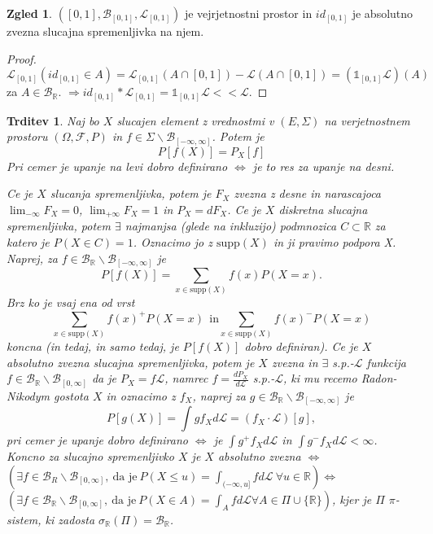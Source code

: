 \documentclass[a4paper,12pt]{article}
\theoremstyle{definition} %
\newtheorem{zgled}[definicija]{Zgled}
\theoremstyle{plain} %
\newtheorem{trditev}[definicija]{Trditev}
\newcommand{\R}{\mathbb{R}}
\newcommand{\F}{\mathcal{F}}
\newcommand{\B}{\mathcal{B}}
\newcommand{\Le}{\mathcal{L}}
\begin{document}
        \begin{zgled}
            $([0, 1], \B_{[0, 1]}, \Le_{[0, 1]})$ je vejrjetnostni prostor in $id_{[0, 1]}$ je absolutno zvezna slucajna spremenljivka na njem.
        \end{zgled}
        \begin{proof}
            $\Le_{[0, 1]}(id_{[0, 1]}\in A) = \Le_{[0, 1]}(A \cap [0, 1]) - \Le(A \cap [0, 1]) = (\mathds{1}_{[0, 1]}\Le)(A)$ za $A \in \B_\R$. $\Rightarrow id_{[0, 1]} * \Le_{[0, 1]} = \mathds{1}_{[0, 1]}\Le << \Le$.
        \end{proof}

        \begin{trditev}
            Naj bo $X$ slucajen element z vrednostmi v $(E, \Sigma)$ na verjetnostnem prostoru $(\Omega, \F, P)$ in $f\in\Sigma\backslash\B_{[-\infty, \infty]}$. Potem je 
            $$
                P\left[f(X)\right] = P_X\left[f\right]
            $$
            Pri cemer je upanje na levi dobro definirano $\iff$ je to res za upanje na desni.
        

        Ce je $X$ slucanja spremenljivka, potem je $F_X$ zvezna z desne in narascajoca $\lim_   {-\infty}F_X = 0$, $\lim_{+\infty}F_X = 1$ in $P_X = dF_X$.
        Ce je $X$ diskretna slucajna spremenljivka, potem $\exists$ najmanjsa (glede na inkluzijo) podmnozica $C \subset \R$ za katero je $P(X \in C) = 1$. Oznacimo jo z $\text{supp}(X)$ in ji pravimo podpora X. Naprej, za $f \in \B_{\R}\backslash\B_  {[-\infty, \infty]}$ je 
            $$
            P[f(X)] = \sum_{x \in \text{supp}(X)}f(x)P(X = x).
            $$
            Brz ko je vsaj ena od vrst 
            $$
        \sum_{x \in \text{supp}(X)}f(x)^+P(X = x) \ \ \text{in} \sum_{x \in \text{supp}(X)}f(x) ^-P(X = x)
            $$
            koncna (in tedaj, in samo tedaj, je $P[f(X)]$ dobro definiran).
        Ce je $X$ absolutno zvezna slucajna spremenljivka, potem je $X$ zvezna in $\exists$ s.p.-$\Le$ funkcija $f \in \B_\R\backslash\B_{[0, \infty]}$ da je $P_X = f\Le$, namrec $f=\frac{dP_X}{d\Le}$ s.p.-$\Le$, ki mu recemo Radon-Nikodym gostota $X$ in oznacimo z   $f_X$, naprej za $g\in \B_\R\backslash\B_{[-\infty, \infty]}$ je
            $$
                P[g(X)] = \int gf_Xd\Le = (f_X \cdot \Le)[g],
            $$
        pri cemer je upanje dobro definirano $\iff$ je $\int g^+f_Xd\Le$ in $\int g^-f_Xd\Le <  \infty$. 
        Koncno za slucajno spremenljivko $X$ je $X$ absolutno zvezna $\iff$ $(\exists f \in \B_R\backslash\B_{[0, \infty]}, \ \text{da je} \ P(X\leq u) = \int_{(-\infty, u]}fd\Le \ \forall u \in \R) \iff$ $(\exists f\in\B_\R\backslash\B_{[0, \infty]}, \ \text{da je} \ P(X \in A) = \int_Afd\Le \forall A\in \Pi \cup \{\R\})$, kjer je $\Pi$     $\pi$-sistem, ki zadosta $\sigma_\R(\Pi) = \B_\R$.
            
        \end{trditev}	
\end{document}
